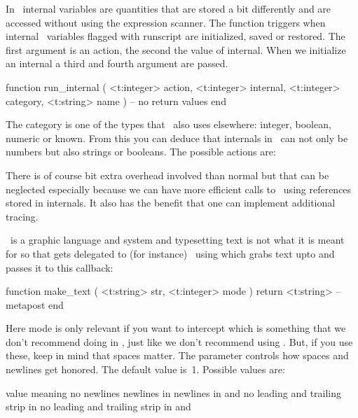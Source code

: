 In \METAPOST\ internal variables are quantities that are stored a bit differently
and are accessed without using the expression scanner. The 
function triggers when internal \METAPOST\ variables flagged with \type
{runscript} are initialized, saved or restored. The first argument is an action,
the second the value of internal. When we initialize an internal a third and
fourth argument are passed.

\starttyping[option=LUA]
function run_internal (
    <t:integer> action,
    <t:integer> internal,
    <t:integer> category,
    <t:string>  name
)
    -- no return values
end
\stoptyping

The category is one of the types that \METAPOST\ also uses elsewhere: integer,
boolean, numeric or known. From this you can deduce that internals in \LUAMETATEX\
can not only be numbers but also strings or booleans. The possible actions are:


There is of course bit extra overhead involved than normal but that can be
neglected especially because we can have more efficient calls to \LUA\ using
references stored in internals. It also has the benefit that one can implement
additional tracing.

\METAPOST\ is a graphic language and system and typesetting text is not what it
is meant for so that gets delegated to (for instance) \TEX\ using \type
[option=MP] {btex} which grabs text upto \type [option=MP] {etex} and passes it
to this callback:

\starttyping[option=LUA]
function make_text ( <t:string> str, <t:integer> mode )
    return <t:string> -- metapost
end
\stoptyping

Here mode is only relevant if you want to intercept  which is
something that we don't recommend doing in \CONTEXT, just like we don't recommend
using \type [option=MP] {btex}. But, if you use these, keep in mind that spaces
matter. The parameter \type [option=MP] {texscriptmode} controls how spaces and
newlines get honored. The default value is~1. Possible values are:

\starttabulate[|l|p|]
\FL
\BC value      \BC meaning \NC \NR
\ML
\NC {} \NC no newlines \NC \NR
\NC {} \NC newlines in  \NC \NR
\NC \type {2} \NC newlines in  and  \NC \NR
\NC \type {3} \NC no leading and trailing strip in  \NC \NR
\NC \type {4} \NC no leading and trailing strip in \type [option=MP] {verbatimtex} and  \NC \NR
\LL
\stoptabulate

